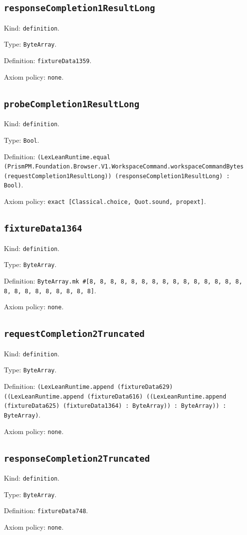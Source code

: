 \documentclass[11pt]{article}
\begin{document}
\subsection*{\texttt{responseCompletion1ResultLong}}
\noindent Kind: \texttt{definition}.\par
\noindent Type: \texttt{ByteArray}.\par
\noindent Definition: \texttt{fixtureData1359}.\par
\noindent Axiom policy: \texttt{none}.\par
\subsection*{\texttt{probeCompletion1ResultLong}}
\noindent Kind: \texttt{definition}.\par
\noindent Type: \texttt{Bool}.\par
\noindent Definition: \texttt{(LexLeanRuntime.equal (PrismPM.Foundation.Browser.V1.WorkspaceCommand.workspaceCommandBytes (requestCompletion1ResultLong)) (responseCompletion1ResultLong) : Bool)}.\par
\noindent Axiom policy: \texttt{exact [Classical.choice, Quot.sound, propext]}.\par
\subsection*{\texttt{fixtureData1364}}
\noindent Kind: \texttt{definition}.\par
\noindent Type: \texttt{ByteArray}.\par
\noindent Definition: \texttt{ByteArray.mk \#[8, 8, 8, 8, 8, 8, 8, 8, 8, 8, 8, 8, 8, 8, 8, 8, 8, 8, 8, 8, 8, 8, 8, 8]}.\par
\noindent Axiom policy: \texttt{none}.\par
\subsection*{\texttt{requestCompletion2Truncated}}
\noindent Kind: \texttt{definition}.\par
\noindent Type: \texttt{ByteArray}.\par
\noindent Definition: \texttt{(LexLeanRuntime.append (fixtureData629) ((LexLeanRuntime.append (fixtureData616) ((LexLeanRuntime.append (fixtureData625) (fixtureData1364) : ByteArray)) : ByteArray)) : ByteArray)}.\par
\noindent Axiom policy: \texttt{none}.\par
\subsection*{\texttt{responseCompletion2Truncated}}
\noindent Kind: \texttt{definition}.\par
\noindent Type: \texttt{ByteArray}.\par
\noindent Definition: \texttt{fixtureData748}.\par
\noindent Axiom policy: \texttt{none}.\par
\end{document}
